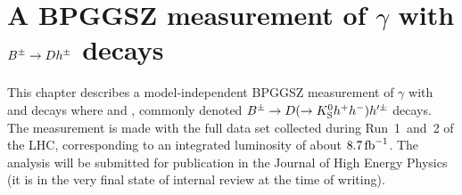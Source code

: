 

\chapter{\texorpdfstring{A BPGGSZ measurement of $\gamma$ with ${{B}^\pm}\rightarrow{\ensuremath{D}} h^\pm$ decays}{A BPGGSZ measurement of gamma with B->Dh decays}}
\label{ch:5-GGSZ-measurement}


This chapter describes a model-independent BPGGSZ measurement of $\gamma$ with \BtoDK and \BtoDpi decays where \DtoKspipi and \DtoKsKK, commonly denoted ${{B}^\pm}\rightarrow{\ensuremath{D}}(\rightarrow{\ensuremath{{K}^0_{\mathrm{S}}}} h^+h^-)h'^\pm$ decays. The measurement is made with the full \lhcb data set collected during Run~1~and~2 of the LHC, corresponding to an integrated luminosity of about $8.7\text{\,fb}^{-1}$. The analysis will be submitted for publication in the Journal of High Energy Physics (it is in the very final state of internal \lhcb review at the time of writing).






